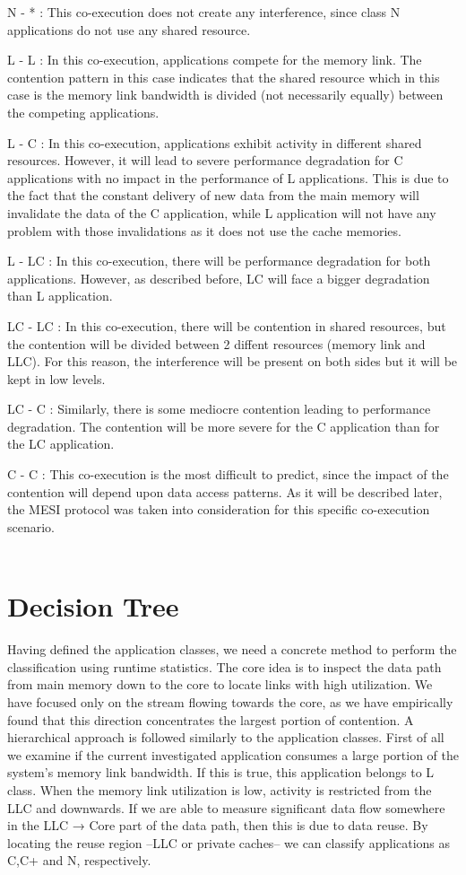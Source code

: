 \documentclass[diploma]{Styles/softlab-thesis}
\begin{document}
N - * : This co-execution does not create any interference, since class N applications do not use any shared resource.

L - L : In this co-execution, applications compete for the memory link. The contention pattern in this case indicates that the shared resource which in this case is the memory link bandwidth is divided (not necessarily equally) between the competing applications.

L - C : In this co-execution, applications exhibit activity in different shared resources. However, it will lead to severe performance degradation for C applications with no impact in the performance of L applications. This is due to the fact that the constant delivery of new data from the main memory will invalidate the data of the C application, while L application will not have any problem with those invalidations as it does not use the cache memories.

L - LC : In this co-execution, there will be performance degradation for both applications. However, as described before, LC will face a bigger degradation than L application.

LC - LC : In this co-execution, there will be contention in shared resources, but the contention will be divided between 2 diffent resources (memory link and LLC). For this reason, the interference will be present on both sides but it will be kept in low levels.

LC - C : Similarly, there is some mediocre contention leading to performance degradation. The contention will be more severe for the C application than for the LC application.

C - C : This co-execution is the most difficult to predict, since the impact of the contention will depend upon data access patterns. As it will be described later, the MESI protocol was taken into consideration for this specific co-execution scenario. \\ \\


\section{Decision Tree}

Having defined the application classes, we need a concrete method to perform the classification using runtime statistics. The core idea is to inspect  the data path from main memory down to the core to locate  links with high utilization. We have focused only on the stream  flowing towards the core, as we have empirically found that this direction concentrates the largest portion of contention. A hierarchical approach is followed similarly to the application classes. First of all we examine if the current investigated application consumes a large portion of the system's memory link bandwidth. If this is true, this application belongs to L class. When the memory link utilization is low, activity is restricted from the LLC and downwards. If we are able to measure significant data flow somewhere in the LLC → Core part of the data path, then this is due to data reuse. By locating the reuse region –LLC
or private caches– we can classify applications as C,C+ and N, respectively. \\
\end{document}
